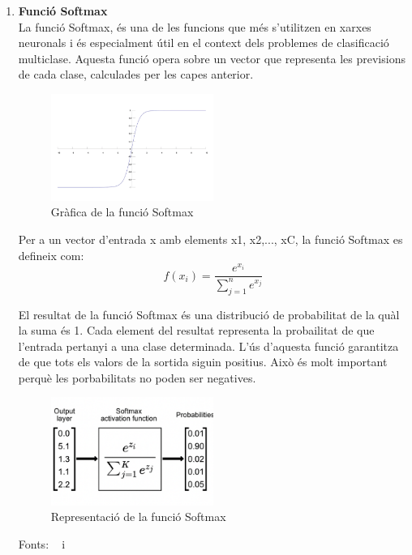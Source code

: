 \begin{enumerate}
\item \textbf{Funció Softmax}\\

La funció Softmax, és una de les funcions que més s'utilitzen en xarxes neuronals i és especialment útil en el context dels problemes de clasificació multiclase. Aquesta funció opera sobre un vector que representa les previsions de cada clase, calculades per les capes anterior.

\begin{figure}[h!]
    \centering
    \includegraphics[width=0.5\textwidth]{./figures/Softmax.png}
    \caption{Gràfica de la funció Softmax}
\end{figure}

Per a un vector d'entrada x amb elements x1, x2,..., xC, la funció Softmax es defineix com:
\[f(x_i) = \frac{e^{x_i}}{\sum_{j=1}^{n} e^{x_j}}\]

El resultat de la funció Softmax és una distribució de probabilitat de la quàl la suma és 1. Cada element del resultat representa la probailitat de que l'entrada pertanyi a una clase determinada. L'ús d'aquesta funció garantitza de que tots els valors de la sortida siguin positius. Això és molt important perquè les porbabilitats no poden ser negatives.

\begin{figure}[H]
    \centering
    \includegraphics[width=0.5\textwidth]{./figures/representacio_Softmax.png}
    \caption{Representació de la funció Softmax}
\end{figure}

Fonts: ~\cite{Hidden_layer} i~\cite{Jacar}
\end{enumerate}

